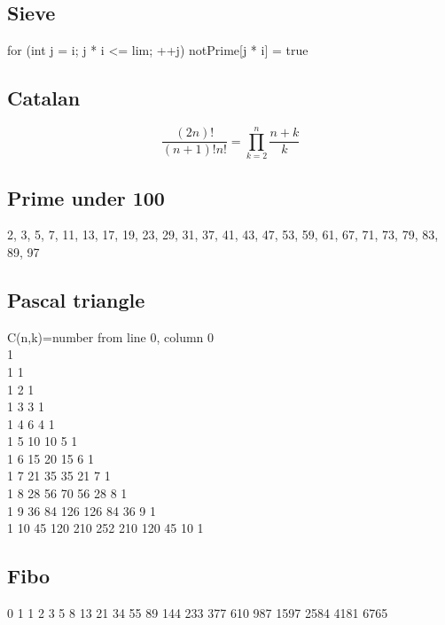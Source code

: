 \documentclass[A4 paper, 12pt, oneside]{article}
\begin{document}
\begin{multicols}{2}
	\subsection{Sieve}
	for (int j = i; j * i <= lim; ++j) notPrime[j * i] = true

	\subsection{Catalan}
	\[\frac{(2n)!}{(n + 1)!n!} = \prod_{k = 2}^n \frac{n + k}{k} \]

	\subsection{Prime under 100}
	2, 3, 5, 7, 11, 13, 17, 19, 23, 29, 31, 37, 41, 43, 47, 53, 59, 61, 67, 71, 73, 79, 83, 89, 97 
	\subsection{Pascal triangle}
C(n,k)=number from line 0, column 0\\
1\\
1 1\\
1 2 1\\ 
1 3 3 1\\ 
1 4 6 4 1\\ 
1 5 10 10 5 1\\ 
1 6 15 20 15 6 1\\ 
1 7 21 35 35 21 7 1\\
1 8 28 56 70 56 28 8 1\\ 
1 9 36 84 126 126 84 36 9 1\\
1 10 45 120 210 252 210 120 45 10 1
	\subsection{Fibo}
	0 1 1 2 3 5 8 13 21 34 55 89 144 233 377 610 987 1597 2584 4181 6765

\end{multicols}
\end{document}
